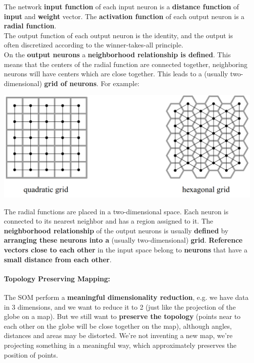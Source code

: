 \documentclass[11pt]{article}
\begin{document}
		The network \textbf{input function} of each input neuron is a \textbf{distance function} of \textbf{input} and \textbf{weight} vector. The \textbf{activation function} of each output neuron is a \textbf{radial function}. \\
		
		The output function of each output neuron is the identity, and the output is often discretized according to the winner-takes-all principle. \\
		
		On the \textbf{output neurons} a \textbf{neighborhood relationship is defined}. This means that the centers of the radial function are connected together, neighboring neurons will have centers which are close together. This leads to a (usually two-dimensional) \textbf{grid of neurons}. For example:
		\begin{center}
			\includegraphics[width=0.85\columnwidth]{img/NN/SOM1}
		\end{center}
		
		The radial functions are placed in a two-dimensional space. Each neuron is connected to its nearest neighbor and has a region assigned to it. The \textbf{neighborhood relationship} of the output neurons is usually \textbf{defined} by \textbf{arranging these neurons into a} (usually two-dimensional) \textbf{grid}. \textbf{Reference vectors close to each other} in the input space belong to \textbf{neurons} that have a \textbf{small distance from each other}.\\
		
		\newpage
		
		\paragraph{Topology Preserving Mapping:} The SOM perform a \textbf{meaningful dimensionality reduction}, e.g. we have data in 3 dimensions, and we want to reduce it to 2 (just like the projection of the globe on a map). But we still want to \textbf{preserve the topology} (points near to each other on the globe will be close together on the map), although angles, distances and areas may be distorted. We're not inventing a new map, we're projecting something in a meaningful way, which approximately preserves the position of points.
		
\end{document}
